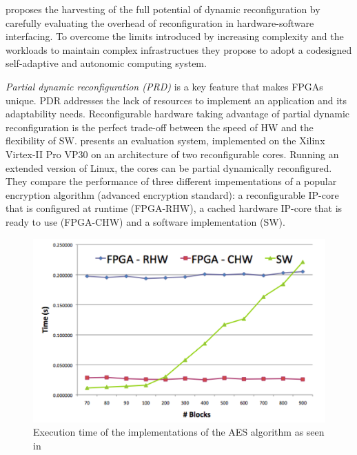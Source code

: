 \cite{reconfigurable} proposes the harvesting of the full potential of dynamic reconfiguration by carefully evaluating the overhead of reconfiguration in hardware-software interfacing. To overcome the limits introduced by increasing complexity and the workloads to maintain complex infrastructues they propose to adopt a codesigned self-adaptive and autonomic computing system. 

\emph{Partial dynamic reconfiguration (PRD)} is a key feature that makes FPGAs unique. PDR addresses the lack of resources to implement an application and its adaptability needs. Reconfigurable hardware taking advantage of partial dynamic reconfiguration is the perfect trade-off between the speed of HW and the flexibility of SW. \cite{reconfigurable} presents an evaluation system, implemented on the Xilinx Virtex-II Pro VP30 on an architecture of two reconfigurable cores. Running an extended version of Linux, the cores can be partial dynamically reconfigured. They compare the performance of three different impementations of a popular encryption algorithm (advanced encryption standard): a reconfigurable IP-core that is configured at runtime (FPGA-RHW), a cached hardware IP-core that is ready to use (FPGA-CHW) and a software implementation (SW). 
\begin{figure}[htb]%
\includegraphics[width=\columnwidth]{Pictures/reconfig.png}%
\caption{Execution time of the implementations of the AES algorithm as seen in \cite{reconfigurable}}%
\label{fig:reconfig}%
\end{figure} 

